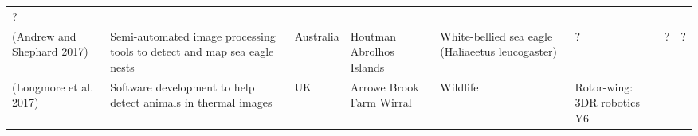\documentclass[]{interact}
\theoremstyle{plain}%
\theoremstyle{definition}
\theoremstyle{remark}
\begin{document}
\begin{longtable}[]{@{}llllllll@{}}
\begin{minipage}[t]{0.01\columnwidth}
?\strut
\end{minipage}\tabularnewline
\begin{minipage}[t]{0.11\columnwidth}\raggedright\strut
(Andrew and Shephard 2017)\strut
\end{minipage} & \begin{minipage}[t]{0.18\columnwidth}\raggedright\strut
Semi-automated image processing tools to detect and map sea eagle
nests\strut
\end{minipage} & \begin{minipage}[t]{0.03\columnwidth}\raggedright\strut
Australia\strut
\end{minipage} & \begin{minipage}[t]{0.14\columnwidth}\raggedright\strut
Houtman Abrolhos Islands\strut
\end{minipage} & \begin{minipage}[t]{0.10\columnwidth}\raggedright\strut
White-bellied sea eagle (Haliaeetus leucogaster)\strut
\end{minipage} & \begin{minipage}[t]{0.09\columnwidth}\raggedright\strut
?\strut
\end{minipage} & \begin{minipage}[t]{0.11\columnwidth}\raggedright\strut
?\strut
\end{minipage} & \begin{minipage}[t]{0.01\columnwidth}\raggedright\strut
?\strut
\end{minipage}\tabularnewline
\begin{minipage}[t]{0.11\columnwidth}\raggedright\strut
(Longmore et al. 2017)\strut
\end{minipage} & \begin{minipage}[t]{0.18\columnwidth}\raggedright\strut
Software development to help detect animals in thermal images\strut
\end{minipage} & \begin{minipage}[t]{0.03\columnwidth}\raggedright\strut
UK\strut
\end{minipage} & \begin{minipage}[t]{0.14\columnwidth}\raggedright\strut
Arrowe Brook Farm Wirral\strut
\end{minipage} & \begin{minipage}[t]{0.10\columnwidth}\raggedright\strut
Wildlife\strut
\end{minipage} & \begin{minipage}[t]{0.09\columnwidth}\raggedright\strut
Rotor-wing: 3DR robotics Y6\strut
\end{minipage} & \begin{minipage}[t]{0.11\columnwidth}\raggedright\strut

\end{minipage}
\end{longtable}
\end{document}
